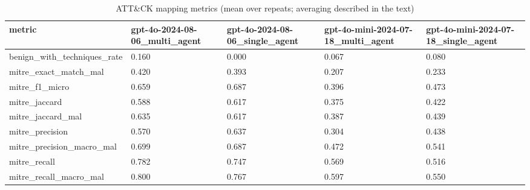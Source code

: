 \begin{table}[!t]
\centering
\caption{ATT\&CK mapping metrics (mean over repeats; averaging described in the text)}
\label{tab:mitre}
\begin{tabular}{lllll}
\hline
metric & gpt-4o-2024-08-06\_multi\_agent & gpt-4o-2024-08-06\_single\_agent & gpt-4o-mini-2024-07-18\_multi\_agent & gpt-4o-mini-2024-07-18\_single\_agent \\
\hline
benign\_with\_techniques\_rate & 0.160 & 0.000 & 0.067 & 0.080 \\
mitre\_exact\_match\_mal & 0.420 & 0.393 & 0.207 & 0.233 \\
mitre\_f1\_micro & 0.659 & 0.687 & 0.396 & 0.473 \\
mitre\_jaccard & 0.588 & 0.617 & 0.375 & 0.422 \\
mitre\_jaccard\_mal & 0.635 & 0.617 & 0.387 & 0.439 \\
mitre\_precision & 0.570 & 0.637 & 0.304 & 0.438 \\
mitre\_precision\_macro\_mal & 0.699 & 0.687 & 0.472 & 0.541 \\
mitre\_recall & 0.782 & 0.747 & 0.569 & 0.516 \\
mitre\_recall\_macro\_mal & 0.800 & 0.767 & 0.597 & 0.550 \\
\hline
\end{tabular}
\end{table}

